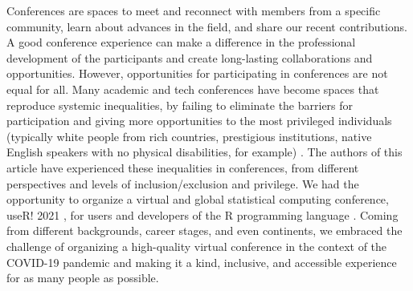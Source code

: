 \documentclass[10pt,letterpaper]{article}
\begin{document}
Conferences are spaces to meet and reconnect with members from a specific community, learn about advances in the field, and share our recent contributions.
A good conference experience can make a difference in the professional development of the participants and create long-lasting collaborations and opportunities. 
However, opportunities for participating in conferences are not equal for all. 
Many academic and tech conferences have become spaces that reproduce systemic inequalities, by failing to eliminate the barriers for participation and giving more opportunities to the most privileged individuals (typically white people from rich countries, prestigious institutions, native English speakers with no physical disabilities, for example) \cite{arendDisparityConferenceRegistration2019, biggsAcademicConferenceChilly2018, depickerRethinkingInclusionDisability2020a, irishIncreasingParticipationUsing2020}.
The authors of this article have experienced these inequalities in conferences, from different perspectives and levels of inclusion/exclusion and privilege.
We had the opportunity to organize a virtual and global statistical computing conference, useR! 2021 \cite{sanchez-tapia_user_2021-2}, for users and developers of the R programming language \cite{r_core_team_2021}.
Coming from different backgrounds, career stages, and even continents, we embraced the challenge of organizing a high-quality virtual conference in the context of the COVID-19 pandemic and making it a kind, inclusive, and accessible experience for as many people as possible.
\end{document}
